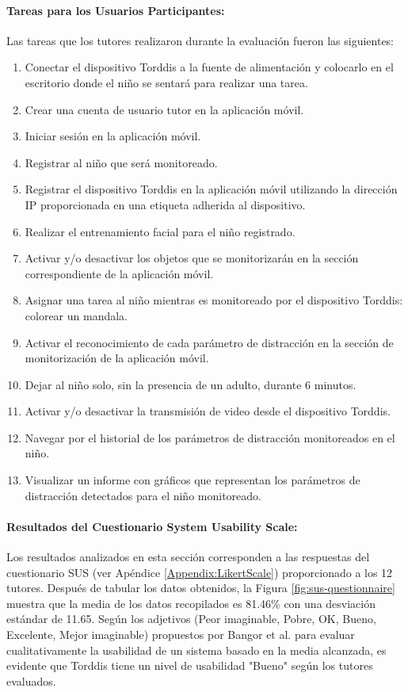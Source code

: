 \documentclass[a4paper,fleqn]{cas-sc}
\begin{document}
				\paragraph{\textbf{Tareas para los Usuarios Participantes:}}
				Las tareas que los tutores realizaron durante la evaluación fueron las siguientes:
				
				\begin{enumerate}
					\item Conectar el dispositivo Torddis a la fuente de alimentación y colocarlo en el escritorio donde el niño se sentará para realizar una tarea.
					\item Crear una cuenta de usuario tutor en la aplicación móvil.
					\item Iniciar sesión en la aplicación móvil.
					\item Registrar al niño que será monitoreado.
					\item Registrar el dispositivo Torddis en la aplicación móvil utilizando la dirección IP proporcionada en una etiqueta adherida al dispositivo.
					\item Realizar el entrenamiento facial para el niño registrado.
					\item Activar y/o desactivar los objetos que se monitorizarán en la sección correspondiente de la aplicación móvil.
					\item Asignar una tarea al niño mientras es monitoreado por el dispositivo Torddis: colorear un mandala.
					\item Activar el reconocimiento de cada parámetro de distracción en la sección de monitorización de la aplicación móvil.
					\item Dejar al niño solo, sin la presencia de un adulto, durante 6 minutos.
					\item Activar y/o desactivar la transmisión de video desde el dispositivo Torddis.
					\item Navegar por el historial de los parámetros de distracción monitoreados en el niño.
					\item Visualizar un informe con gráficos que representan los parámetros de distracción detectados para el niño monitoreado.
				\end{enumerate}
				
				\paragraph{\textbf{Resultados del Cuestionario System Usability Scale:}}
				Los resultados analizados en esta sección corresponden a las respuestas del cuestionario SUS (ver Apéndice \ref{Appendix:LikertScale}) proporcionado a los 12 tutores. Después de tabular los datos obtenidos, la Figura \ref{fig:sus-questionnaire} muestra que la media de los datos recopilados es 81.46\% con una desviación estándar de 11.65. Según los adjetivos (Peor imaginable, Pobre, OK, Bueno, Excelente, Mejor imaginable) propuestos por Bangor et al. \cite{Bangor2008AnEmpirical} para evaluar cualitativamente la usabilidad de un sistema basado en la media alcanzada, es evidente que Torddis tiene un nivel de usabilidad "Bueno" según los tutores evaluados.
				
\end{document}
